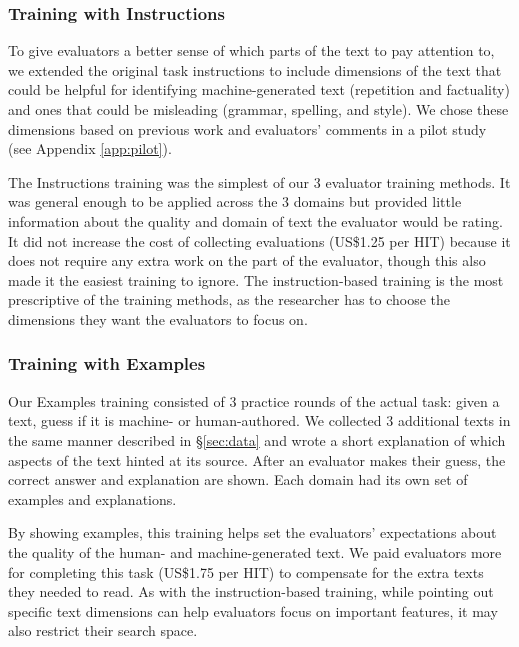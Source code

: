\subsubsection{Training with Instructions}
To give evaluators a better sense of which parts of the text to pay attention to, we extended the original task instructions to include dimensions of the text that could be helpful for identifying machine-generated text (repetition and factuality) and ones that could be misleading (grammar, spelling, and style).
We chose these dimensions based on previous work \citep{ippolito-etal-2020-automatic} and evaluators' comments in a pilot study (see Appendix \ref{app:pilot}). 

The Instructions training was the simplest of our 3 evaluator training methods.
It was general enough to be applied across the 3 domains but provided little information about the quality and domain of text the evaluator would be rating.
It did not increase the cost of collecting evaluations (US\$1.25 per HIT) because it does not require any extra work on the part of the evaluator, though this also made it the easiest training to ignore.
The instruction-based training is the most prescriptive of the training methods, as the researcher has to choose the dimensions they want the evaluators to focus on.

\subsubsection{Training with Examples}
Our Examples training consisted of 3 practice rounds of the actual task: given a text, guess if it is machine- or human-authored.
We collected 3 additional texts in the same manner described in \S\ref{sec:data} and wrote a short explanation of which aspects of the text hinted at its source.
After an evaluator makes their guess, the correct answer and explanation are shown.
Each domain had its own set of examples and explanations.

By showing examples, this training helps set the evaluators' expectations about the quality of the human- and machine-generated text.
We paid evaluators more for completing this task (US\$1.75 per HIT) to compensate for the extra texts they needed to read.
As with the instruction-based training, while pointing out specific text dimensions can help evaluators focus on important features, it may also restrict their search space.

